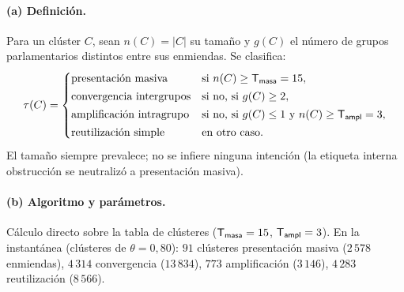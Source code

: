 \paragraph{(a) Definición.} Para un clúster $C$, sean $n(C)=|C|$ su tamaño y $g(C)$
el número de grupos parlamentarios distintos entre sus enmiendas. Se clasifica:
\[
\tau(C)=\begin{cases}
\text{presentación masiva} & \text{si } n(C)\ge \mathsf{T_{masa}}=15,\\[2pt]
\text{convergencia intergrupos} & \text{si no, si } g(C)\ge 2,\\[2pt]
\text{amplificación intragrupo} & \text{si no, si } g(C)\le 1 \text{ y } n(C)\ge \mathsf{T_{ampl}}=3,\\[2pt]
\text{reutilización simple} & \text{en otro caso.}
\end{cases}
\]
El tamaño siempre prevalece; no se infiere ninguna intención (la etiqueta interna
\og{}obstrucción\fg{} se neutralizó a \og{}presentación masiva\fg{}).

\paragraph{(b) Algoritmo y parámetros.} Cálculo directo sobre la tabla de clústeres
($\mathsf{T_{masa}}=15$, $\mathsf{T_{ampl}}=3$). En la instantánea (clústeres de
$\theta=0{,}80$): $91$ clústeres \og{}presentación masiva\fg{} ($2\,578$ enmiendas),
$4\,314$ \og{}convergencia\fg{} ($13\,834$), $773$ \og{}amplificación\fg{}
($3\,146$), $4\,283$ \og{}reutilización\fg{} ($8\,566$).

